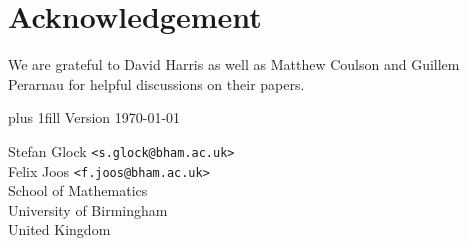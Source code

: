 \documentclass[10pt]{amsart}
\theoremstyle{definition}
\theoremstyle{claimstyle}
\theoremstyle{stepstyle}
\numberwithin{equation}{section}
\begin{document}
\section*{Acknowledgement}

We are grateful to David Harris as well as Matthew Coulson and Guillem Perarnau for helpful discussions on their papers.








\vfill

\small
\vskip2mm plus 1fill
\noindent
Version \today{}
\bigbreak



\noindent
Stefan Glock
{\tt <s.glock@bham.ac.uk>}\\
Felix Joos
{\tt <f.joos@bham.ac.uk>}\\
School of Mathematics\\ 
University of Birmingham\\
United Kingdom
\end{document}
